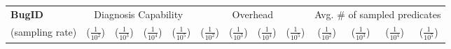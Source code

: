 \begin{table*}
  \centering
  \scriptsize
  \newcommand{\Yes}[1]{\checkmark{}$_#1$}
  \newcommand{\No}[0]{-}
  \begin{adjustwidth}{-.9in}{-.9in}
  {
  \begin{tabular}{lcccccccccccc}
    \toprule     
   {\bf BugID} & \multicolumn{4}{c}{ Diagnosis Capability} &\multicolumn{4}{c}{Overhead} & \multicolumn{4}{c}{Avg. \# of sampled predicates} \\
                           
    \cmidrule(lr){2-5}
    \cmidrule(lr){6-9}
    \cmidrule(lr){10-13}
    (sampling rate)  &($\frac{1}{10^2}$)&($\frac{1}{10^3}$)&($\frac{1}{10^4}$)& ($\frac{1}{10^5}$)  &($\frac{1}{10^2}$) &($\frac{1}{10^3}$)&($\frac{1}{10^4}$)  & ($\frac{1}{10^5}$)  & ($\frac{1}{10^2}$)  & ($\frac{1}{10^3}$)    & ($\frac{1}{10^4}$)   &  ($\frac{1}{10^5}$)         \\
    \midrule 


\end{tabular}}
\end{adjustwidth}
\end{table*}
